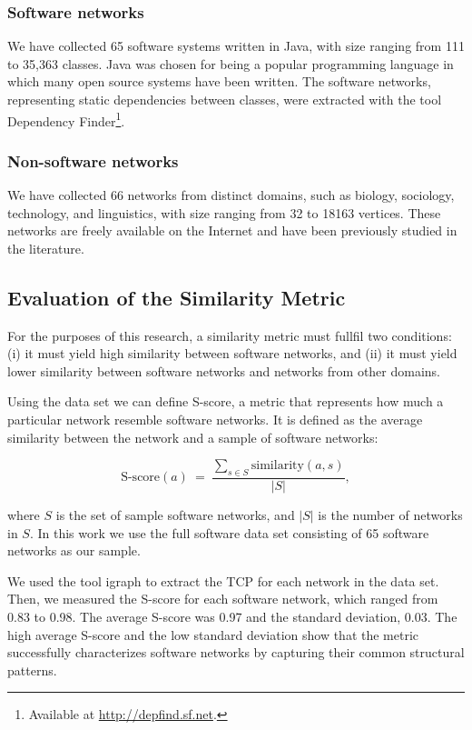 \subsubsection{Software networks} We have collected 65 software systems written
in Java, with size ranging from 111 to 35,363 classes. Java was chosen for being
a popular programming language in which many open source systems have been
written. The software networks, representing static dependencies between
classes, were extracted with the tool Dependency Finder\footnote{Available at
\url{http://depfind.sf.net}.}.

\subsubsection{Non-software networks} We have collected 66 networks from
distinct domains, such as biology, sociology, technology, and linguistics, with
size ranging from 32 to 18163 vertices. These networks are freely available on
the Internet and have been previously studied in the literature.

\subsection{Evaluation of the Similarity Metric}


For the purposes of this research, a similarity metric must fullfil two
conditions: (i) it must yield high similarity between software networks, and
(ii) it must yield lower similarity between software networks and networks from
other domains.

Using the data set we can define S-score, a metric that represents how much a
particular network resemble software networks. It is defined as the average
similarity between the network and a sample of software networks:

$$
\mathrm{S\mbox{-}score}(a) ~=~ \frac{
\displaystyle\sum_{s \in S} \mathrm{similarity}(a, s)
}{|S|} \mathrm{,}
$$

where $S$ is the set of sample software networks, and $|S|$ is the number of
networks in $S$. In this work we use the full software data set consisting of 65
software networks as our sample.

We used the tool igraph \cite{igraph} to extract the TCP for each network in the
data set. Then, we measured the S-score for each software network, which ranged
from 0.83 to 0.98. The average S-score was 0.97 and the standard deviation,
0.03. The high average S-score and the low standard deviation show that the
metric successfully characterizes software networks by capturing their common
structural patterns.

